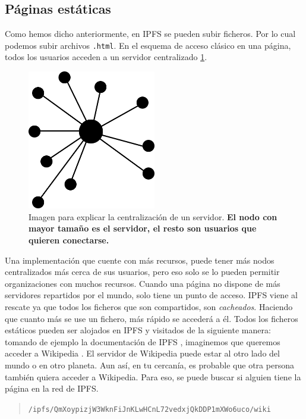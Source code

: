 \subsection{Páginas estáticas}
Como hemos dicho anteriormente, en IPFS se pueden subir ficheros. Por lo cual podemos subir archivos \verb|.html|.
En el esquema de acceso clásico en una página, todos los usuarios acceden a un servidor centralizado \ref{fg:centralizado}.
\begin{figure}[H]
    \centering
    \includegraphics[width=0.5\textwidth]{Figures/Centralizado.png}
    \caption{Imagen para explicar la centralización de un servidor. \textbf{El nodo con mayor tamaño es el servidor, el resto son usuarios que quieren conectarse.}}
    \label{fg:centralizado}
\end{figure}
Una implementación que cuente con más recursos, puede tener más nodos centralizados más cerca de sus usuarios, pero eso solo se lo pueden permitir organizaciones con muchos recursos.
Cuando una página no dispone de más servidores repartidos por el mundo, solo tiene un punto de acceso. IPFS viene al rescate ya que todos los ficheros que son compartidos, son \textit{cacheados}. Haciendo que cuanto más se use un fichero, más rápido se accederá a él.
Todos los ficheros estáticos pueden ser alojados en IPFS y visitados de la siguiente manera: tomando de ejemplo la documentación de IPFS \cite{web:ipfs_whatis}, imaginemos que queremos acceder a Wikipedia \cite{web:wikipedia_main}.
El servidor de Wikipedia puede estar al otro lado del mundo o en otro planeta. Aun así, en tu cercanía, es probable que otra persona también quiera acceder a Wikipedia. Para eso, se puede buscar si alguien tiene la página en la red de IPFS.
\begin{quote}
    \verb|/ipfs/QmXoypizjW3WknFiJnKLwHCnL72vedxjQkDDP1mXWo6uco/wiki|
\end{quote}
